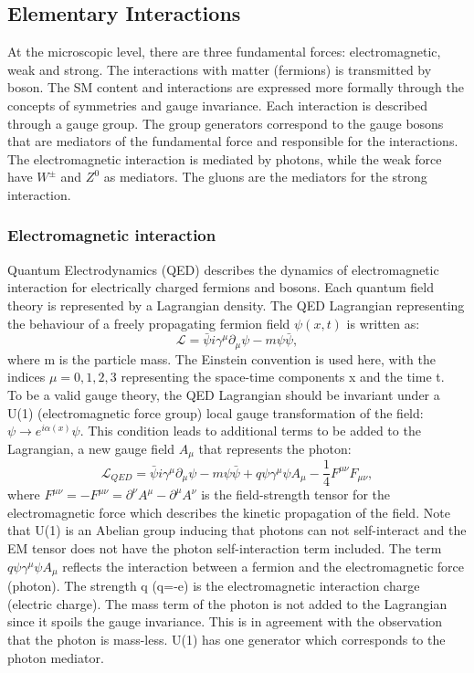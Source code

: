 \subsection{Elementary Interactions}
\label{chap1:SM:EI}
At the microscopic level, there are three fundamental forces: electromagnetic, weak and strong. The interactions with matter (fermions) is transmitted by boson. The SM content and interactions are expressed more formally through the concepts of symmetries and gauge invariance. Each interaction is described through a gauge group. The group generators correspond to the gauge bosons that are mediators of the fundamental force and responsible for the interactions. The electromagnetic interaction is mediated by photons, while the weak force have $W^{\pm}$ and $Z^{0}$ as mediators. The gluons are the mediators for the strong interaction.

\subsubsection{Electromagnetic interaction}
Quantum Electrodynamics (QED) describes the dynamics of electromagnetic interaction for electrically charged fermions and bosons. Each quantum field theory is represented by a Lagrangian density. The QED Lagrangian representing the behaviour of a freely propagating fermion field $\psi (x, t)$ is written as: 
\begin{equation}
    \mathcal{L} = \bar{\psi}i\gamma^\mu\partial_\mu\psi - m\psi\bar{\psi},
\end{equation}
where m is the particle mass. The Einstein convention is used here, with the indices $\mu= 0,1,2,3$ representing the space-time components x and the time t. \\ 
To be a valid gauge theory, the QED Lagrangian should be invariant under a U(1) (electromagnetic force group) local gauge transformation of the field: $\psi\rightarrow e^{i\alpha(x)}\psi$. This condition leads to additional terms to be added to the Lagrangian, a new gauge field $A_{\mu}$ that represents the photon:
\begin{equation}
    \mathcal{L}_{QED} = \bar{\psi}i\gamma^\mu\partial_\mu\psi - m\psi\bar{\psi} + q\psi\gamma^{\mu}\psi A_{\mu} - \frac{1}{4}F^{\mu\nu}F_{\mu\nu},
\end{equation}
where $F^{\mu\nu} = - F^{\mu\nu} = \partial^{\nu}A^{\mu} - \partial^{\mu}A^{\nu}$ is the field-strength tensor for the electromagnetic force which describes the kinetic propagation of the field. Note that U(1) is an Abelian group inducing that photons can not self-interact and the EM tensor does not have the photon self-interaction term included. The term $q\psi\gamma^{\mu}\psi A_{\mu}$ reflects the interaction between a fermion and the electromagnetic force (photon). The strength q (q=-e) is the electromagnetic interaction charge (electric charge). The mass term of the photon is not added to the Lagrangian since it spoils the gauge invariance. This is in agreement with the observation that the photon is mass-less. U(1) has one generator which corresponds to the photon mediator.

